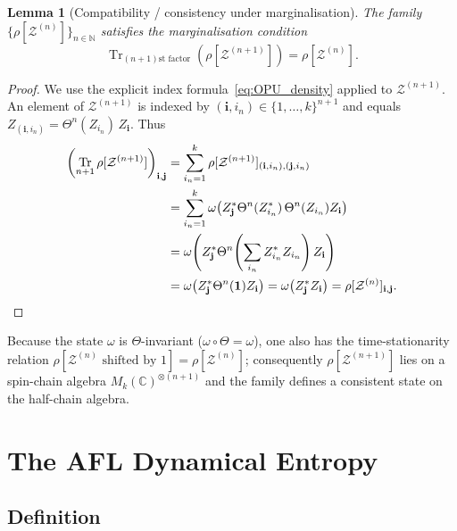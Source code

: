\documentclass[12pt,a4paper]{article}
\newtheorem{lemma}[theorem]{Lemma}
\DeclareMathOperator{\Tr}{Tr}
\begin{document}
\begin{lemma}[Compatibility / consistency under marginalisation]\label{lem:compat}
The family $\{\rho[\mathcal{Z}^{(n)}]\}_{n\in\mathbb{N}}$ satisfies the
marginalisation condition
\begin{equation}\label{eq:compat}
  \Tr_{(n+1)\text{st factor}}\!\left(\rho[\mathcal{Z}^{(n+1)}]\right)
  = \rho[\mathcal{Z}^{(n)}].
\end{equation}
\end{lemma}
\begin{proof}
We use the explicit index formula~\eqref{eq:OPU_density} applied to
$\mathcal{Z}^{(n+1)}$.  An element of $\mathcal{Z}^{(n+1)}$ is indexed by
$(\mathbf{i},i_n)\in\{1,\ldots,k\}^{n+1}$ and equals
$Z_{(\mathbf{i},i_n)} = \Theta^n(Z_{i_n})\,Z_{\mathbf{i}}$.
Thus
\begin{align*}
  \left(\Tr_{n+1}\rho[\mathcal{Z}^{(n+1)}]\right)_{\mathbf{i},\mathbf{j}}
  &= \sum_{i_n=1}^k \rho[\mathcal{Z}^{(n+1)}]_{(\mathbf{i},i_n),(\mathbf{j},i_n)} \\
  &= \sum_{i_n=1}^k \omega\!\left(Z_{\mathbf{j}}^*\Theta^n(Z_{i_n}^*)\,\Theta^n(Z_{i_n})
     Z_{\mathbf{i}}\right) \\
  &= \omega\!\left(Z_{\mathbf{j}}^*
     \Theta^n\!\left(\sum_{i_n}Z_{i_n}^* Z_{i_n}\right)
     Z_{\mathbf{i}}\right) \\
  &= \omega\!\left(Z_{\mathbf{j}}^*\Theta^n(\mathbf{1})Z_{\mathbf{i}}\right)
   = \omega\!\left(Z_{\mathbf{j}}^* Z_{\mathbf{i}}\right)
   = \rho[\mathcal{Z}^{(n)}]_{\mathbf{i},\mathbf{j}}. \qedhere
\end{align*}
\end{proof}

Because the state $\omega$ is $\Theta$-invariant ($\omega\circ\Theta=\omega$),
one also has the time-stationarity relation $\rho[\mathcal{Z}^{(n)}\text{ shifted
by 1}]=\rho[\mathcal{Z}^{(n)}]$; consequently $\rho[\mathcal{Z}^{(n+1)}]$ lies
on a spin-chain algebra $M_k(\mathbb{C})^{\otimes(n+1)}$ and the family defines
a consistent state on the half-chain algebra.

\section{The AFL Dynamical Entropy}

\subsection{Definition}
\end{document}
